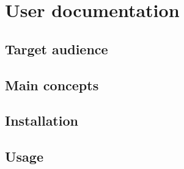 
\chapter{User documentation}

\section{Target audience}

\section{Main concepts}

\section{Installation}

\section{Usage}

